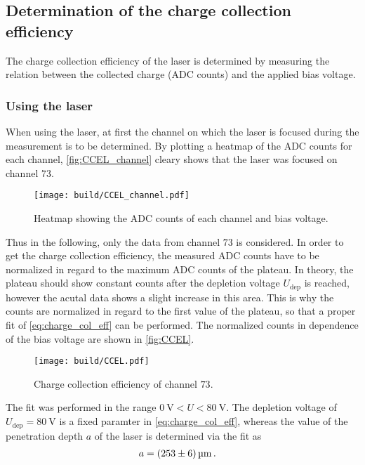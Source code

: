 \subsection{Determination of the charge collection efficiency}

The charge collection efficiency of the laser is determined by measuring the relation between the
collected charge (ADC counts) and the applied bias voltage.

\subsubsection{Using the laser}

When using the laser, at first the channel on which the laser is focused during the measurement is to
be determined. By plotting a heatmap of the ADC counts for each channel, \autoref{fig:CCEL_channel}
cleary shows that the laser was focused on channel $73$.

\begin{figure}[H]
  \centering
  \texttt{[image: build/CCEL\_channel.pdf]}
  \caption{Heatmap showing the ADC counts of each channel and bias voltage.}
  \label{fig:CCEL_channel}
\end{figure}

Thus in the following, only the data from channel $73$ is considered. In order to get the
charge collection efficiency, the measured ADC counts
have to be normalized in regard to the maximum ADC counts of the plateau.
In theory, the plateau should show constant counts after the depletion voltage $U_{\text{dep}}$ is reached,
however the acutal data shows a slight increase in this area. This is why the counts
are normalized in regard to the first value of the plateau, so that a proper fit of 
\eqref{eq:charge_col_eff} can be performed. The normalized counts in dependence of the
bias voltage are shown in \autoref{fig:CCEL}.

\begin{figure}[H]
  \centering
  \texttt{[image: build/CCEL.pdf]}
  \caption{Charge collection efficiency of channel $73$.}
  \label{fig:CCEL}
\end{figure}

The fit was performed in the range $\qty{0}{\volt} < U < \qty{80}{\volt}$.
The depletion voltage of $U_{\text{dep}} = \qty{80}{\volt}$ is a fixed paramter in 
\eqref{eq:charge_col_eff}, whereas the value of the penetration depth $a$ of the laser is determined
via the fit as
\begin{align*}
  a &= \qty{253+-6}{\micro\meter} \, .
\end{align*}


